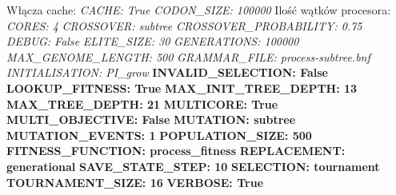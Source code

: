 Włącza cache: \newline
\textit{CACHE:                         True} \newline
\textit{CODON\_SIZE:                   100000} \newline
Ilość wątków procesora:
\textit{CORES:                         4} \newline
\textit{CROSSOVER:                     subtree} \newline
\textit{CROSSOVER\_PROBABILITY:         0.75} \newline
\textit{DEBUG:                         False} \newline
\textit{ELITE\_SIZE:                   30} \newline
\textit{GENERATIONS:                   100000} \newline
\textit{MAX\_GENOME\_LENGTH:           500} \newline
\textit{GRAMMAR\_FILE:                  process-subtree.bnf} \newline
\textit{INITIALISATION:                 PI\_grow} \newline
\textbf{INVALID\_SELECTION:              False} \newline
\textbf{LOOKUP\_FITNESS:                 True} \newline
\textbf{MAX\_INIT\_TREE\_DEPTH:            13} \newline
\textbf{MAX\_TREE\_DEPTH:                 21} \newline
\textbf{MULTICORE:                      True} \newline
\textbf{MULTI\_OBJECTIVE:                False} \newline
\textbf{MUTATION:                       subtree} \newline
\textbf{MUTATION\_EVENTS:                1} \newline
\textbf{POPULATION\_SIZE:                500} \newline
\textbf{FITNESS\_FUNCTION:               process\_fitness} \newline
\textbf{REPLACEMENT:                    generational} \newline
\textbf{SAVE\_STATE\_STEP:                10} \newline
\textbf{SELECTION:                      tournament} \newline
\textbf{TOURNAMENT\_SIZE:                16} \newline
\textbf{VERBOSE:                        True} \newline
